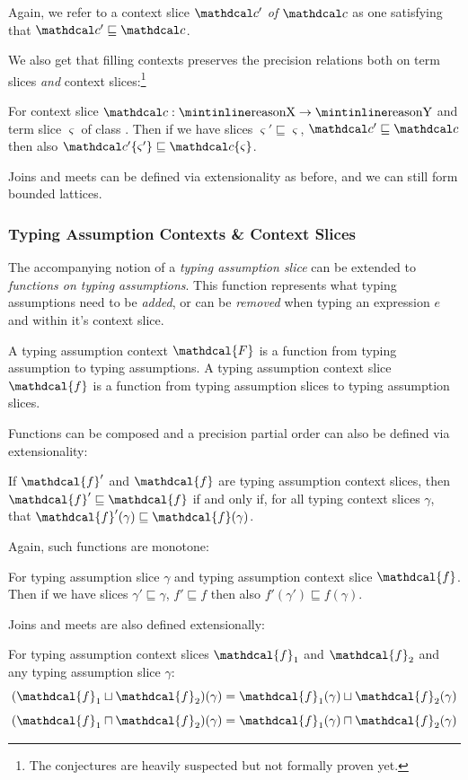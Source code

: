 Again, we refer to a context slice $\Cs'$ \textit{of} $\Cs$ as one satisfying that $\Cs' \sqsubseteq \Cs$.

We also get that filling contexts preserves the precision relations both on term slices \textit{and} context slices:\footnote{The conjectures are heavily suspected but not formally proven yet.}
\begin{conjecture}
For context slice $\Cs : \code{X} \to \code{Y}$ and term slice $\varsigma$ of class . Then if we have slices $\varsigma' \sqsubseteq \varsigma$, $\Cs' \sqsubseteq \Cs$ then also $\Cs'\{\varsigma'\} \sqsubseteq \Cs\{\varsigma\}$.
\end{conjecture}

Joins and meets can be defined via extensionality as before, and we can still form bounded lattices.

\subsubsection{Typing Assumption Contexts \& Context Slices}
The accompanying notion of a \textit{typing assumption slice} can be extended to \textit{functions on typing assumptions}. This function represents what typing assumptions need to be \textit{added}, or can be \textit{removed} when typing an expression $e$ and within it's context slice.

\renewcommand{\F}{\mathdcal{F}}
\newcommand{\f}{\mathdcal{f}}
\begin{definition}
A typing assumption context $\F$ is a function from typing assumption to typing assumptions. A typing assumption context slice $\f$ is a function from typing assumption slices to typing assumption slices.
\end{definition}

Functions can be composed and a precision partial order can also be defined via extensionality:
\begin{definition}\label{def:FunctionPrecision}
If $\f'$ and $\f$ are typing assumption context slices, then $\f' \sqsubseteq \f$ if and only if, for all typing context slices $\gamma$, that $\f'(\gamma) \sqsubseteq \f(\gamma)$.
\end{definition}
Again, such functions are monotone:
\begin{conjecture}
For typing assumption slice $\gamma$ and typing assumption context slice $\f$. Then if we have slices $\gamma' \sqsubseteq \gamma$, $f' \sqsubseteq f$ then also $f'(\gamma') \sqsubseteq f(\gamma)$.
\end{conjecture}
Joins and meets are also defined extensionally:
\begin{definition} For typing assumption context slices $\f_1$ and $\f_2$ and any typing assumption slice $\gamma$:
\[(\f_1 \sqcup \f_2)(\gamma) = \f_1(\gamma) \sqcup \f_2(\gamma)\]
\[(\f_1 \sqcap \f_2)(\gamma) = \f_1(\gamma) \sqcap \f_2(\gamma)\]
\end{definition}

